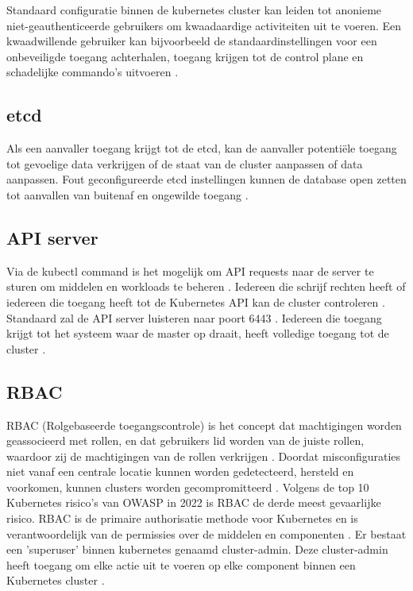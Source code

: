Standaard configuratie binnen de kubernetes cluster kan leiden tot anonieme niet-geauthenticeerde gebruikers om kwaadaardige activiteiten uit te voeren. Een kwaadwillende gebruiker kan bijvoorbeeld de standaardinstellingen voor een onbeveiligde toegang achterhalen, toegang krijgen tot de control plane en schadelijke commando's uitvoeren \autocite{shamim2020xi}.

\subsection{etcd}
Als een aanvaller toegang krijgt tot de etcd, kan de aanvaller potentiële toegang tot gevoelige data verkrijgen of de staat van de cluster aanpassen of data aanpassen. Fout geconfigureerde etcd instellingen kunnen de database open zetten tot aanvallen van buitenaf en ongewilde toegang \autocite{KubernetesDocs-2023}.

\subsection{API server}
Via de kubectl command is het mogelijk om API requests naar de server te sturen om middelen en workloads te beheren \autocite{KubernetesDocs-2023}. Iedereen die schrijf rechten heeft of iedereen die toegang heeft tot de Kubernetes API kan de cluster controleren \autocite{KubernetesDocs-2023}. 
Standaard zal de API server luisteren naar poort 6443 \autocite{KubernetesDocs-2023}. Iedereen die toegang krijgt tot het systeem waar de master op draait, heeft volledige toegang tot de cluster \autocite{Rice2018}. \newline

\subsection{RBAC}
RBAC (Rolgebaseerde toegangscontrole) is het concept dat machtigingen worden geassocieerd met rollen, en dat gebruikers lid worden van de juiste rollen, waardoor zij de machtigingen van de rollen verkrijgen \autocite{Sandhu1998}. Doordat misconfiguraties niet vanaf een centrale locatie kunnen worden gedetecteerd, hersteld en voorkomen, kunnen clusters worden gecompromitteerd \autocite{OWASP-2023}. Volgens de top 10 Kubernetes risico's van OWASP in 2022 is RBAC de derde meest gevaarlijke risico. RBAC is de primaire authorisatie methode voor Kubernetes en is verantwoordelijk van de permissies over de middelen en componenten \autocite{OWASP-2023}. Er bestaat een 'superuser' binnen kubernetes genaamd cluster-admin. Deze cluster-admin heeft toegang om elke actie uit te voeren op elke component binnen een Kubernetes cluster \autocite{OWASP-2023}. 

